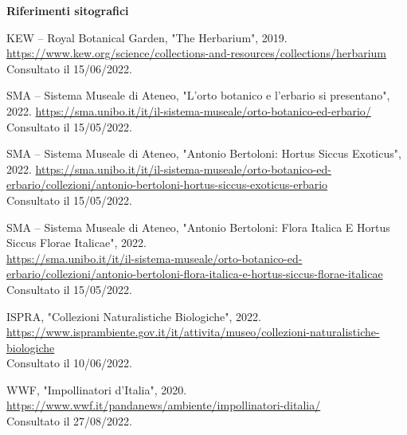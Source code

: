 \documentclass[main.tex]{subfiles}
\begin{document}
\begin{Large} \textbf{Riferimenti sitografici}\end{Large}

\bigskip

KEW – Royal Botanical Garden, "The Herbarium", 2019.\\
\href{https://www.kew.org/science/collections-and-resources/collections/herbarium}{https://www.kew.org/science/collections-and-resources/collections/herbarium}\\
Consultato il 15/06/2022.

\bigskip

SMA – Sistema Museale di Ateneo, "L’orto botanico e l’erbario si presentano", 2022.
\href{https://sma.unibo.it/it/il-sistema-museale/orto-botanico-ed-erbario/}{https://sma.unibo.it/it/il-sistema-museale/orto-botanico-ed-erbario/}\\
Consultato il 15/05/2022.

\bigskip

SMA – Sistema Museale di Ateneo, "Antonio Bertoloni: Hortus Siccus Exoticus", 2022.
\href{https://sma.unibo.it/it/il-sistema-museale/orto-botanico-ed-erbario/collezioni/antonio-bertoloni-hortus-siccus-exoticus-erbario}{https://sma.unibo.it/it/il-sistema-museale/orto-botanico-ed-erbario/collezioni/antonio-bertoloni-hortus-siccus-exoticus-erbario}\\
Consultato il 15/05/2022.

\bigskip

SMA – Sistema Museale di Ateneo, "Antonio Bertoloni: Flora Italica E Hortus Siccus Florae Italicae", 2022. \\
\href{https://sma.unibo.it/it/il-sistema-museale/orto-botanico-ed-erbario/collezioni/antonio-bertoloni-flora-italica-e-hortus-siccus-florae-italicae}{https://sma.unibo.it/it/il-sistema-museale/orto-botanico-ed-erbario/collezioni/antonio-bertoloni-flora-italica-e-hortus-siccus-florae-italicae}\\
Consultato il 15/05/2022.

\bigskip

ISPRA, "Collezioni Naturalistiche Biologiche", 2022. \\
\href{https://www.isprambiente.gov.it/it/attivita/museo/collezioni-naturalistiche-biologiche}{https://www.isprambiente.gov.it/it/attivita/museo/collezioni-naturalistiche-biologiche}\\
Consultato il 10/06/2022.

\bigskip

WWF, "Impollinatori d’Italia", 2020. \\
\href{https://www.wwf.it/pandanews/ambiente/impollinatori-ditalia/}{https://www.wwf.it/pandanews/ambiente/impollinatori-ditalia/}\\
Consultato il 27/08/2022.
\end{document}
